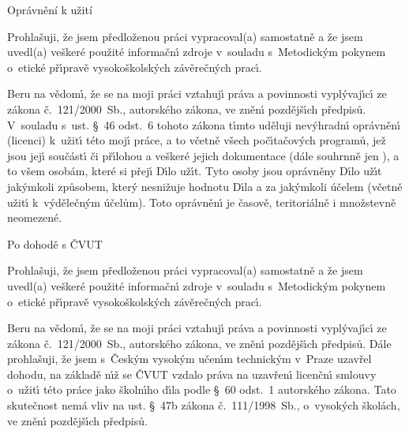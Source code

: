 \sec Oprávn{\v e}ní k u{\v z}ití

Prohla\v suji, \v ze jsem p\v redlo\v zenou pr\'aci vypracoval(a) samostatn\v e a \v ze jsem uvedl(a) ve\v sker\'e pou\v zit\'e informa\v cn\'\i{} zdroje v~souladu s~Metodick\'ym pokynem o~etick\'e p\v r\'\i{}prav\v e vysoko\v skolsk\'ych z\'av\v ere\v cn\'ych prac\'\i{}.

		Beru na v\v edom\'\i{}, \v ze se na moji pr\'aci vztahuj\'\i{} pr\'ava a povinnosti vypl\'yvaj\'\i{}c\'\i{} ze z\'akona \v c.~121/2000~Sb., autorsk\'eho z\'akona, ve zn\v en\'\i{} pozd\v ej\v s\'\i{}ch p\v redpis{\r u}. V~souladu s~ust. \S{}~46 odst.~6 tohoto z\'akona t\'\i{}mto ud\v eluji nev\'yhradn\'\i{} opr\'avn\v en\'\i{} (licenci) k~u\v zit\'\i{} t\'eto moj\'\i{} pr\'ace, a to v\v cetn\v e v\v sech po\v c\'\i{}ta\v cov\'ych program{\r u}, je\v z jsou jej\'\i{} sou\v c\'ast\'\i{} \v ci p\v r\'\i{}lohou a ve\v sker\'e jejich dokumentace (d\'ale souhrnn\v e jen ), a to v\v sem osob\'am, kter\'e si p\v rej\'\i{} D\'\i{}lo u\v z\'\i{}t. Tyto osoby jsou opr\'avn\v eny D\'\i{}lo u\v z\'\i{}t jak\'ymkoli zp{\r u}sobem, kter\'y nesni\v zuje hodnotu D\'\i{}la a za jak\'ymkoli \'u\v celem (v\v cetn\v e u\v zit\'\i{} k~v\'yd\v ele\v cn\'ym \'u\v cel{\r u}m). Toto opr\'avn\v en\'\i{} je \v casov\v e, teritori\'aln\v e i mno\v zstevn\v e neomezen\'e.

\sec Po dohod{\v e} s {\v C}VUT

Prohla\v suji, \v ze jsem p\v redlo\v zenou pr\'aci vypracoval(a) samostatn\v e a \v ze jsem uvedl(a) ve\v sker\'e pou\v zit\'e informa\v cn\'\i{} zdroje v~souladu s~Metodick\'ym pokynem o~etick\'e p\v r\'\i{}prav\v e vysoko\v skolsk\'ych z\'av\v ere\v cn\'ych prac\'\i{}.

		Beru na v\v edom\'\i{}, \v ze se na moji pr\'aci vztahuj\'\i{} pr\'ava a povinnosti vypl\'yvaj\'\i{}c\'\i{} ze z\'akona \v c.~121/2000~Sb., autorsk\'eho z\'akona, ve zn\v en\'\i{} pozd\v ej\v s\'\i{}ch p\v redpis{\r u}. D\'ale prohla\v suji, \v ze jsem s~\v Cesk\'ym vysok\'ym u\v cen\'\i{}m technick\'ym v~Praze uzav\v rel dohodu, na z\'aklad\v e n\'\i{}\v z se \v CVUT vzdalo pr\'ava na uzav\v ren\'\i{} licen\v cn\'\i{} smlouvy o~u\v zit\'\i{} t\'eto pr\'ace jako \v skoln\'\i{}ho d\'\i{}la podle \S{}~60 odst.~1 autorsk\'eho z\'akona. Tato skute\v cnost nem\'a vliv na ust. \S{}~47b z\'akona \v c.~111/1998~Sb., o~vysok\'ych \v skol\'ach, ve zn\v en\'\i{} pozd\v ej\v s\'\i{}ch p\v redpis{\r u}.

\bye
